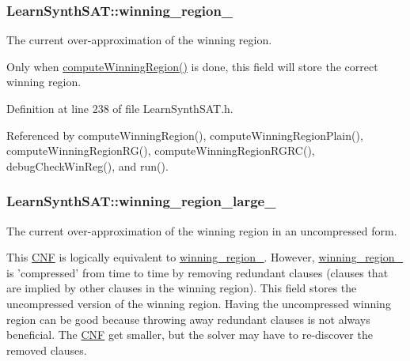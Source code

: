 \hypertarget{classLearnSynthSAT_aced2bce789c7a93ed4b5391dd0690616}{
\subsubsection[{winning\-\_\-region\-\_\-}]{ Learn\-Synth\-S\-A\-T\-::winning\-\_\-region\-\_\-\hspace{0.3cm}{\ttfamily [protected]}}}\label{classLearnSynthSAT_aced2bce789c7a93ed4b5391dd0690616}


The current over-\/approximation of the winning region. 

Only when \hyperlink{classLearnSynthSAT_a055b4699184d09bb7f6b15052ac684db}{compute\-Winning\-Region()} is done, this field will store the correct winning region. 

Definition at line 238 of file Learn\-Synth\-S\-A\-T.\-h.



Referenced by compute\-Winning\-Region(), compute\-Winning\-Region\-Plain(), compute\-Winning\-Region\-R\-G(), compute\-Winning\-Region\-R\-G\-R\-C(), debug\-Check\-Win\-Reg(), and run().

\hypertarget{classLearnSynthSAT_aaa79e8772e9ce8e59dc14e3bb1784256}{
\subsubsection[{winning\-\_\-region\-\_\-large\-\_\-}]{ Learn\-Synth\-S\-A\-T\-::winning\-\_\-region\-\_\-large\-\_\-\hspace{0.3cm}{\ttfamily [protected]}}}\label{classLearnSynthSAT_aaa79e8772e9ce8e59dc14e3bb1784256}


The current over-\/approximation of the winning region in an uncompressed form. 

This \hyperlink{classCNF}{C\-N\-F} is logically equivalent to \hyperlink{classLearnSynthSAT_aced2bce789c7a93ed4b5391dd0690616}{winning\-\_\-region\-\_\-}. However, \hyperlink{classLearnSynthSAT_aced2bce789c7a93ed4b5391dd0690616}{winning\-\_\-region\-\_\-} is 'compressed' from time to time by removing redundant clauses (clauses that are implied by other clauses in the winning region). This field stores the uncompressed version of the winning region. Having the uncompressed winning region can be good because throwing away redundant clauses is not always beneficial. The \hyperlink{classCNF}{C\-N\-F} get smaller, but the solver may have to re-\/discover the removed clauses. 

